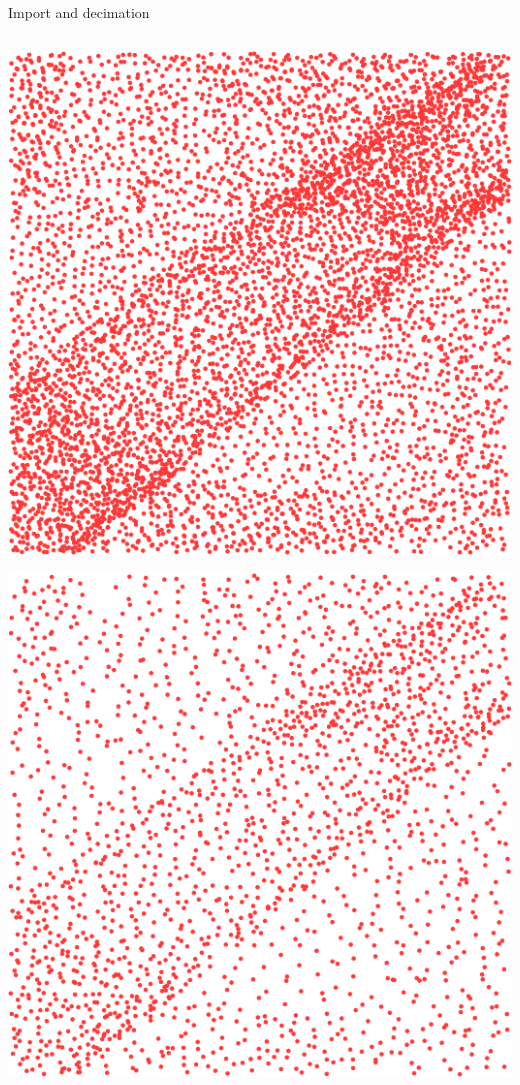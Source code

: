 \documentclass[xcolor={dvipsnames,usenames},beamer,aspectratio=43]{beamer}
\begin{document}
\begin{frame}{Import and decimation}
\begin{columns}
\begin{column}{0.22\textwidth}
\begin{center}
\includegraphics[width=\textwidth]{features/full}

\smallskip

\includegraphics[width=\textwidth]{features/preserve}

\end{center}

\end{column}
\end{columns}

\end{frame}
\end{document}
